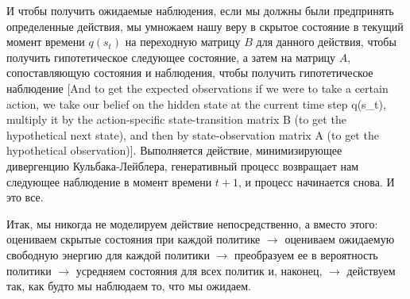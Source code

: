 \documentclass[twoside,leqno, 11pt]{article}
\begin{document}
	И чтобы получить ожидаемые наблюдения, если мы должны были предпринять определенные действия, мы умножаем нашу веру в скрытое состояние в текущий момент времени $q(s_t)$ на переходную матрицу $B$ для данного действия, чтобы получить гипотетическое следующее состояние, а затем на матрицу $A$, сопоставляющую состояния и наблюдения, чтобы получить гипотетическое наблюдение [And to get the expected observations if we were to take a certain action, we take our belief on the hidden state at the current time step q(s\_t), multiply it by the action-specific state-transition matrix B (to get the hypothetical next state), and then by state-observation matrix A (to get the hypothetical observation)]. Выполняется действие, минимизирующее дивергенцию Кульбака-Лейблера, генеративный процесс возвращает нам следующее наблюдение в момент времени $t+1$, и процесс начинается снова. И это все.
	
	\begin{figure}[h]
	\end{figure}
	
	
	Итак, мы никогда не моделируем действие непосредственно, а вместо этого: оцениваем скрытые состояния при каждой политике $\rightarrow$ оцениваем ожидаемую свободную энергию для каждой политики $\rightarrow$ преобразуем ее в вероятность политики $\rightarrow$ усредняем состояния для всех политик и, наконец, $\rightarrow$ действуем так, как будто мы наблюдаем то, что мы ожидаем.
	
\end{document}
